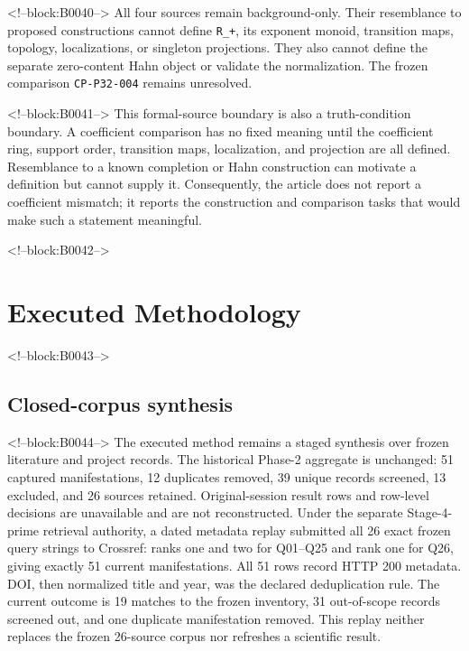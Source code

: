 \documentclass[11pt]{article}
\begin{document}
<!--block:B0040-->
All four sources remain background-only. Their resemblance to proposed
constructions cannot define \texttt{R\_+}, its exponent monoid,
transition maps, topology, localizations, or singleton projections. They
also cannot define the separate zero-content Hahn object or validate the
normalization. The frozen comparison \texttt{CP-P32-004} remains
unresolved.

<!--block:B0041-->
This formal-source boundary is also a truth-condition boundary. A
coefficient comparison has no fixed meaning until the coefficient ring,
support order, transition maps, localization, and projection are all
defined. Resemblance to a known completion or Hahn construction can
motivate a definition but cannot supply it. Consequently, the article
does not report a coefficient mismatch; it reports the construction and
comparison tasks that would make such a statement meaningful.

<!--block:B0042-->
\hypertarget{3-executed-methodology}{%
\section{Executed Methodology}\label{3-executed-methodology}}

<!--block:B0043-->
\hypertarget{31-closed-corpus-synthesis}{%
\subsection{Closed-corpus
synthesis}\label{31-closed-corpus-synthesis}}

<!--block:B0044-->
The executed method remains a staged synthesis over frozen literature and
project records.  The historical Phase-2 aggregate is unchanged: 51 captured
manifestations, 12 duplicates removed, 39 unique records screened, 13 excluded,
and 26 sources retained.  Original-session result rows and row-level decisions
are unavailable and are not reconstructed.  Under the separate Stage-4-prime
retrieval authority, a dated metadata replay submitted all 26 exact frozen query
strings to Crossref: ranks one and two for Q01--Q25 and rank one for Q26, giving
exactly 51 current manifestations.  All 51 rows record HTTP 200 metadata.  DOI,
then normalized title and year, was the declared deduplication rule.  The current
outcome is 19 matches to the frozen inventory, 31 out-of-scope records screened
out, and one duplicate manifestation removed.  This replay neither replaces the
frozen 26-source corpus nor refreshes a scientific result.
\end{document}
